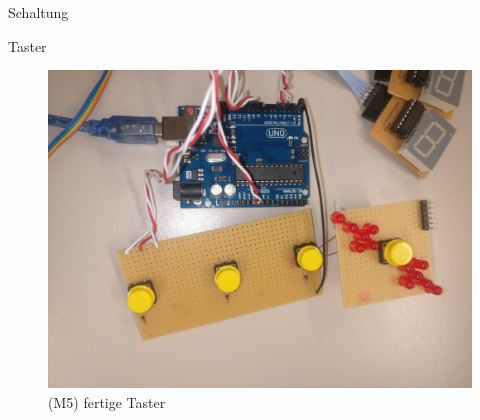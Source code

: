 \documentclass[mathserif,9pt]{article}
\begin{document}
    \begin{frame}{Schaltung}
        \begin{block}{Taster}
               \begin{figure}
                    \centering
                    \includegraphics[height=0.5\paperheight]{img/buttons-soldered.jpg}
                    \caption[M5]{(M5) fertige Taster}
                    \label{fig:taster}
               \end{figure}
        \end{block}
    \end{frame}
    
\end{document}
